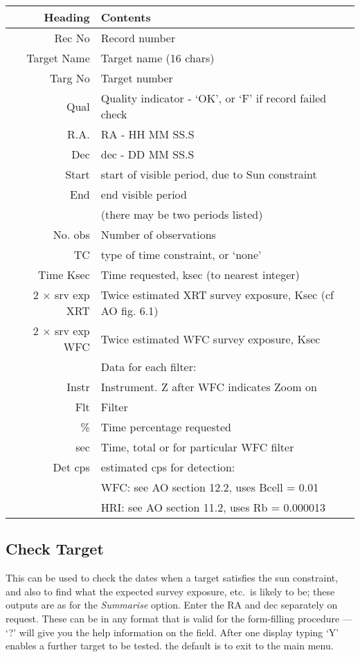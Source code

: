 \begin{center}
\begin{tabular}{rl}
\setlength{\leftmargin}{40mm}
\hspace{20mm}Heading	& Contents\\ \hline
Rec No		& Record number\\
Target Name	& Target name (16 chars)\\
Targ No		& Target number\\
Qual		& Quality indicator - `OK', or `F' if record failed check\\
R.A.		& RA - HH MM SS.S\\
Dec		& dec - DD MM SS.S\\
Start		& start of visible period, due to Sun constraint\\
End		& end visible period\\
		& (there may be two periods listed)\\
No. obs		& Number of observations\\
TC		& type of time constraint, or `none'\\
Time Ksec	& Time requested, ksec (to nearest integer)\\
2 $\times$ srv exp XRT	& Twice estimated XRT survey exposure, Ksec (cf AO fig. 6.1)\\
2 $\times$ srv exp WFC	& Twice estimated WFC survey exposure, Ksec \\
		& Data for each filter:\\
Instr		& Instrument. Z after WFC indicates Zoom on\\
Flt		& Filter\\
\%		& Time percentage requested\\
sec		& Time, total or for particular WFC filter \\
Det cps		& estimated cps for detection:\\
		& WFC:  see AO section 12.2, uses Bcell = 0.01\\
		& HRI:  see AO section 11.2, uses Rb = 0.000013\\
\end{tabular}
\end{center}

\subsection{Check Target}

This can be used to check the dates when a target satisfies the sun
constraint, and also to find what the expected survey exposure,
etc.\ is likely to be; these outputs are as for the {\em Summarise}
option.  Enter the RA and dec separately on request.  These can be in
any format that is valid for the form-filling procedure --- `?' will
give you the help information on the field. After one display typing
`Y' enables a further target to be tested. the default is to exit to
the main menu.

